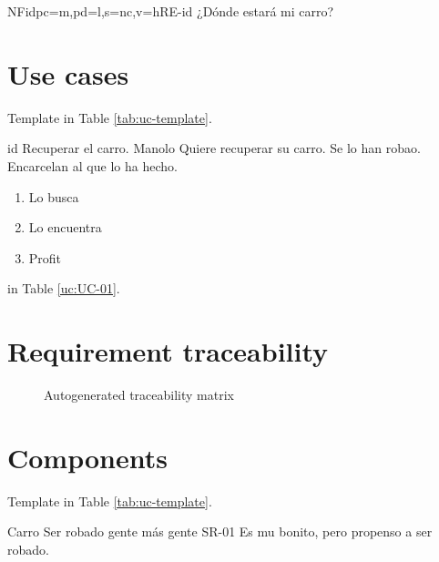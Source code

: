 \documentclass[a4paper,10pt]{article}
\begin{document}
  \begin{softwareReq}{NF}{id}{pc=m,pd=l,s=nc,v=h}{RE-id}
    ¿Dónde estará mi carro?
  \end{softwareReq}

  \FloatBarrier


  \section{Use cases}
  Template in Table \ref{tab:uc-template}.

  \printuctemplate

  \begin{useCase}{id}
    {Recuperar el carro.}  %
    {Manolo}  %
    {Quiere recuperar su carro.}  %
    {Se lo han robao.}  %
    {Encarcelan al que lo ha hecho.}  %
    \begin{enumerate}  %
      \item Lo busca
      \item Lo encuentra
      \item Profit
    \end{enumerate}
  \end{useCase}


  \FloatBarrier

   in Table \ref{uc:UC-01}.

  \section{Requirement traceability}
  \begin{figure}[h]
    \centering{}
    \caption{Autogenerated traceability matrix}
  \end{figure}


  \FloatBarrier


  \section{Components}
  Template in Table \ref{tab:uc-template}.

  \printcomptemplate

  \begin{component}{Carro}
    {Ser robado}  %
    {\NA}  %
    {gente}  %
    {más gente}  %
    {SR-01}  %
    Es mu bonito, pero propenso a ser robado.
  \end{component}
\end{document}
